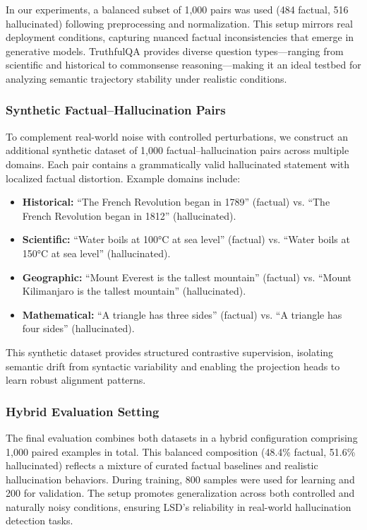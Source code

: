 \documentclass[11pt]{article}
\begin{document}
In our experiments, a balanced subset of 1,000 pairs was used (484 factual, 516 hallucinated) following preprocessing and normalization. This setup mirrors real deployment conditions, capturing nuanced factual inconsistencies that emerge in generative models. TruthfulQA provides diverse question types—ranging from scientific and historical to commonsense reasoning—making it an ideal testbed for analyzing semantic trajectory stability under realistic conditions.

\subsubsection{Synthetic Factual–Hallucination Pairs}

To complement real-world noise with controlled perturbations, we construct an additional synthetic dataset of 1,000 factual–hallucination pairs across multiple domains. Each pair contains a grammatically valid hallucinated statement with localized factual distortion. Example domains include:
\begin{itemize}[leftmargin=*]
    \item \textbf{Historical:} ``The French Revolution began in 1789'' (factual) vs. ``The French Revolution began in 1812'' (hallucinated).
    \item \textbf{Scientific:} ``Water boils at 100°C at sea level'' (factual) vs. ``Water boils at 150°C at sea level'' (hallucinated).
    \item \textbf{Geographic:} ``Mount Everest is the tallest mountain'' (factual) vs. ``Mount Kilimanjaro is the tallest mountain'' (hallucinated).
    \item \textbf{Mathematical:} ``A triangle has three sides'' (factual) vs. ``A triangle has four sides'' (hallucinated).
\end{itemize}

This synthetic dataset provides structured contrastive supervision, isolating semantic drift from syntactic variability and enabling the projection heads to learn robust alignment patterns. 

\subsubsection{Hybrid Evaluation Setting}

The final evaluation combines both datasets in a hybrid configuration comprising 1,000 paired examples in total. This balanced composition (48.4\% factual, 51.6\% hallucinated) reflects a mixture of curated factual baselines and realistic hallucination behaviors. During training, 800 samples were used for learning and 200 for validation. The setup promotes generalization across both controlled and naturally noisy conditions, ensuring LSD’s reliability in real-world hallucination detection tasks.
\end{document}
